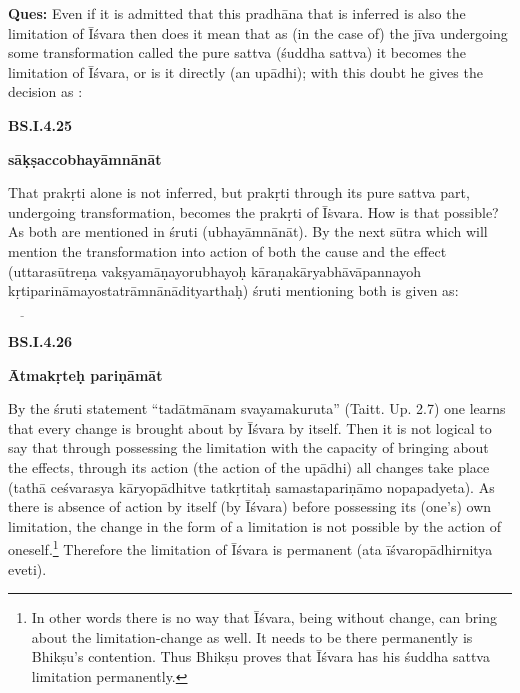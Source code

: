 \textbf{Ques:} Even if it is admitted that this pradhāna that is inferred is also the limitation of Īśvara then does it mean that as (in the case of) the jīva undergoing some transformation called the pure sattva (śuddha sattva) it becomes the limitation of Īśvara, or is it directly (an upādhi); with this doubt he gives the decision as : 

\textbf{}



\textbf{BS.I.4.25}

\textbf{sāḳṣaccobhayāmnānāt}

That prakṛti alone is not inferred, but prakṛti through its pure sattva part, undergoing transformation, becomes the prakṛti of Īṡvara. How is that possible? As both are mentioned in śruti (ubhayāmnānāt). By the next sūtra which will mention the transformation into action of both the cause and the effect (uttarasūtreṇa vakṣyamāṇayorubhayoḥ kāraṇakāryabhāvāpannayoh kṛtiparināmayostatrāmnānādityarthaḥ) śruti mentioning both is given as:

\textbf{}


 $\underline{\qquad}$

\textbf{BS.I.4.26}

\textbf{Ātmakṛteḥ pariṇāmāt}

By the śruti statement “tadātmānam svayamakuruta” (Taitt. Up. 2.7) one learns that every change is brought about by Īśvara by itself. Then it is not logical to say that through possessing the limitation with the capacity of bringing about the effects, through its action (the action of the upādhi) all changes take place (tathā ceśvarasya kāryopādhitve tatkṛtitaḥ samastapariṇāmo nopapadyeta). As there is absence of action by itself (by Īśvara) before possessing its (one’s) own limitation, the change in the form of a limitation is not possible by the action of oneself.\footnote{In other words there is no way that Īśvara, being without change, can bring about the limitation-change  as well. It needs to be there permanently is Bhikṣu’s contention. Thus Bhikṣu proves that Īśvara has his śuddha sattva limitation permanently.} Therefore the limitation of Īśvara is permanent (ata īśvaropādhirnitya eveti).

